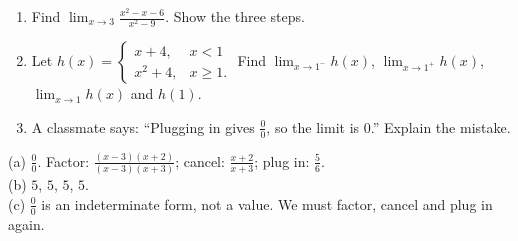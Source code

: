 \begin{exo}{}
\begin{enumerate}[label=(\alph*)]
\item Find $\displaystyle\lim_{x\to3}\frac{x^2-x-6}{x^2-9}$. Show the three steps.
\item Let $h(x)=\begin{cases}x+4, & x<1\\ x^2+4, & x\ge1.\end{cases}$ Find $\lim_{x\to1^-}h(x)$, $\lim_{x\to1^+}h(x)$, $\lim_{x\to1}h(x)$ and $h(1)$.
\item A classmate says: ``Plugging in gives $\frac00$, so the limit is $0$.'' Explain the mistake.
\end{enumerate}
\work{4cm}
\begin{solution}
(a) $\frac00$. Factor: $\frac{(x-3)(x+2)}{(x-3)(x+3)}$; cancel: $\frac{x+2}{x+3}$; plug in: $\frac56$.\\
(b) $5$, $5$, $5$, $5$.\\
(c) $\frac00$ is an indeterminate form, not a value. We must factor, cancel and plug in again.
\end{solution}
\end{exo}

